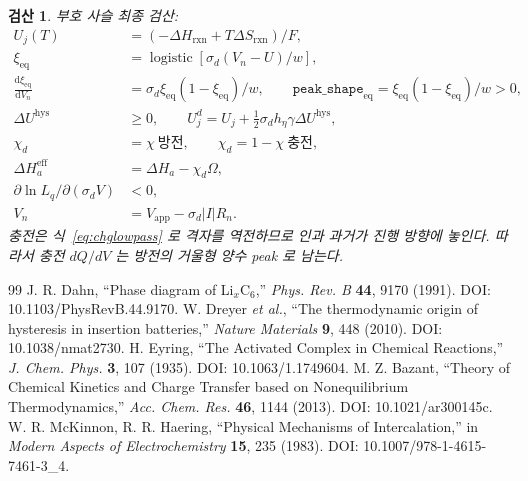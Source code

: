 \documentclass[11pt,a4paper]{article}
\newtheorem*{verifybox}{검산}
\newcommand{\dd}{\mathrm{d}}
\newcommand{\app}{\mathrm{app}}
\newcommand{\eq}{\mathrm{eq}}
\newcommand{\eff}{\mathrm{eff}}
\newcommand{\hys}{\mathrm{hys}}
\begin{document}
\begin{verifybox}
부호 사슬 최종 검산:
\begin{align}
U_j(T)&=(-\Delta H_{\mathrm{rxn}}+T\Delta S_{\mathrm{rxn}})/F,\label{eq:sign1}\\
\xi_{\eq}&=\operatorname{logistic}[\sigma_d(V_n-U)/w],\label{eq:sign2}\\
\frac{\dd\xi_{\eq}}{\dd V_n}&=\sigma_d\xi_{\eq}(1-\xi_{\eq})/w,\qquad
\texttt{peak\_shape}_{\eq}=\xi_{\eq}(1-\xi_{\eq})/w>0,\label{eq:sign3}\\
\Delta U^\hys&\ge0,\qquad U_j^d=U_j+\frac12\sigma_dh_\eta\gamma\Delta U^\hys,\label{eq:sign4}\\
\chi_d&=\chi\ \text{방전},\qquad \chi_d=1-\chi\ \text{충전},\label{eq:sign5}\\
\Delta H_a^\eff&=\Delta H_a-\chi_d\Omega,\label{eq:sign6}\\
\partial\ln L_q/\partial(\sigma_dV)&<0,\label{eq:sign7}\\
V_n&=V_\app-\sigma_d|I|R_n.\label{eq:sign8}
\end{align}
충전은 식~\eqref{eq:chglowpass} 로 격자를 역전하므로 인과 과거가 진행 방향에 놓인다. 따라서 충전 $dQ/dV$ 는 방전의 거울형 양수 peak 로 남는다.
\end{verifybox}

\begin{thebibliography}{99}
 J. R. Dahn, ``Phase diagram of Li$_x$C$_6$,'' \emph{Phys. Rev. B} \textbf{44}, 9170 (1991). DOI: 10.1103/PhysRevB.44.9170.
 W. Dreyer \emph{et al.}, ``The thermodynamic origin of hysteresis in insertion batteries,'' \emph{Nature Materials} \textbf{9}, 448 (2010). DOI: 10.1038/nmat2730.
 H. Eyring, ``The Activated Complex in Chemical Reactions,'' \emph{J. Chem. Phys.} \textbf{3}, 107 (1935). DOI: 10.1063/1.1749604.
 M. Z. Bazant, ``Theory of Chemical Kinetics and Charge Transfer based on Nonequilibrium Thermodynamics,'' \emph{Acc. Chem. Res.} \textbf{46}, 1144 (2013). DOI: 10.1021/ar300145c.
 W. R. McKinnon, R. R. Haering, ``Physical Mechanisms of Intercalation,'' in \emph{Modern Aspects of Electrochemistry} \textbf{15}, 235 (1983). DOI: 10.1007/978-1-4615-7461-3\_4.
\end{thebibliography}
\end{document}
